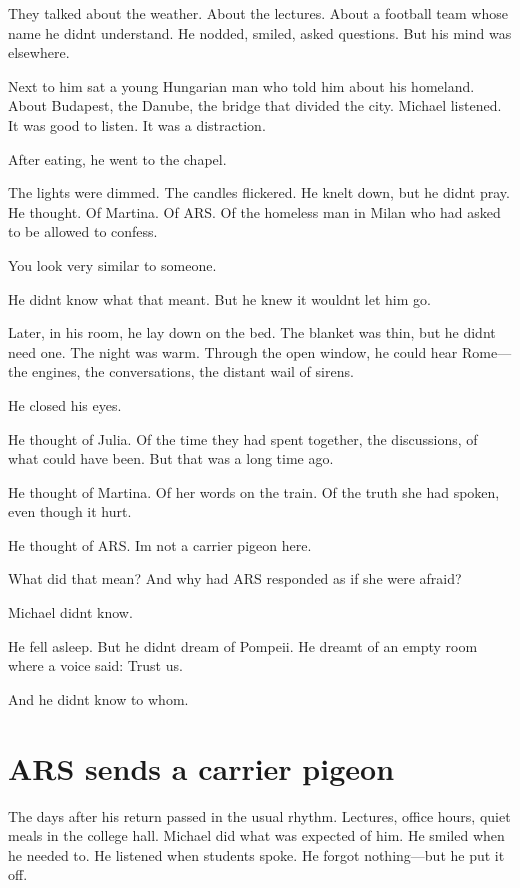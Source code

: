 \documentclass[
]{article}
\begin{document}
They talked about the weather. About the lectures. About a football team whose name he didn\textquotesingle t understand. He nodded, smiled, asked questions. But his mind was elsewhere.

Next to him sat a young Hungarian man who told him about his homeland. About Budapest, the Danube, the bridge that divided the city. Michael listened. It was good to listen. It was a distraction.

After eating, he went to the chapel.

The lights were dimmed. The candles flickered. He knelt down, but he didn\textquotesingle t pray. He thought. Of Martina. Of ARS. Of the homeless man in Milan who had asked to be allowed to confess.

You look very similar to someone.

He didn\textquotesingle t know what that meant. But he knew it wouldn\textquotesingle t let him go.

Later, in his room, he lay down on the bed. The blanket was thin, but he didn\textquotesingle t need one. The night was warm. Through the open window, he could hear Rome---the engines, the conversations, the distant wail of sirens.

He closed his eyes.

He thought of Julia. Of the time they had spent together, the discussions, of what could have been. But that was a long time ago.

He thought of Martina. Of her words on the train. Of the truth she had spoken, even though it hurt.

He thought of ARS. I\textquotesingle m not a carrier pigeon here.

What did that mean? And why had ARS responded as if she were afraid?

Michael didn\textquotesingle t know.

He fell asleep. But he didn\textquotesingle t dream of Pompeii. He dreamt of an empty room where a voice said: Trust us.

And he didn\textquotesingle t know to whom.

\section{ARS sends a carrier pigeon}\label{ars-sends-a-carrier-pigeon}

The days after his return passed in the usual rhythm. Lectures, office hours, quiet meals in the college hall. Michael did what was expected of him. He smiled when he needed to. He listened when students spoke. He forgot nothing---but he put it off.
\end{document}
